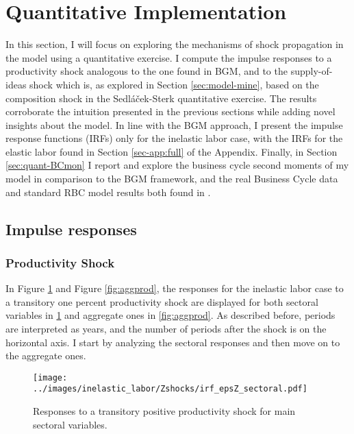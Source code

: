 \documentclass[a4paper,12pt]{article} %
\numberwithin{equation}{section} %
\numberwithin{figure}{section}
\numberwithin{table}{section}
\begin{document}
\section{Quantitative Implementation}
\label{sec:quant}

In this section, I will focus on exploring the mechanisms of shock propagation in the model using a quantitative exercise.
I compute the impulse responses to a productivity shock analogous to the one found in BGM, and to the supply-of-ideas shock which is,
as explored in Section \ref{sec:model-mine}, based on the composition shock in the Sedláček-Sterk quantitative exercise. 
The results corroborate the intuition presented in the previous sections while adding novel insights about the model. In line with the 
BGM approach, I present the impulse response functions (IRFs) only for the inelastic labor case, with the IRFs for the elastic labor
found in Section \ref{sec-app:full} of the Appendix. Finally, in Section \ref{sec:quant-BCmon} I report and explore the 
business cycle second moments of my model
in comparison to the BGM framework, and the real Business Cycle data and standard RBC model results both found in 
\textcite{king1999resuscitating}.

\subsection{Impulse responses}
\label{sec:quant-IRF}

\subsubsection{Productivity Shock}

In Figure \ref{fig:multiprod} and Figure \ref{fig:aggprod}, the responses for the inelastic labor case
to a transitory one percent productivity shock are displayed for both sectoral variables in 
\ref{fig:multiprod} and aggregate ones in \ref{fig:aggprod}. As described before, periods are interpreted as years,
and the number of periods after the shock is on the horizontal axis. I start by analyzing the sectoral responses and
then move on to the aggregate ones. 

\begin{figure}[H]
  \centering
  \texttt{[image: ../images/inelastic\_labor/Zshocks/irf\_epsZ\_sectoral.pdf]}
  \caption{Responses to a transitory positive productivity shock for main sectoral variables.}
  \label{fig:multiprod}
\end{figure}
\end{document}
